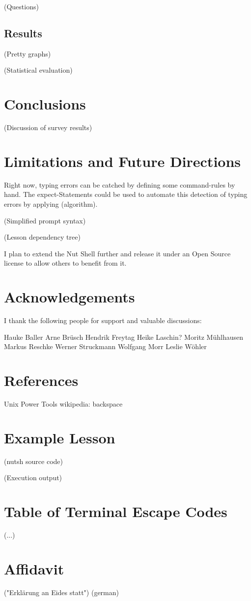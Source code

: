 \documentclass[twoside,blue]{tubsreprt}
\begin{document}
(Questions)

\section{Results}

(Pretty graphs)

(Statistical evaluation)

\chapter{Conclusions}

(Discussion of survey results)

\chapter{Limitations and Future Directions}

Right now, typing errors can be catched by defining some command-rules by hand. The expect-Statements could be used to automate this detection of typing errors by applying (algorithm).

    (Simplified prompt syntax)

    (Lesson dependency tree)

I plan to extend the Nut Shell further and release it under an Open Source license to allow others to benefit from it.

\chapter{Acknowledgements}

I thank the following people for support and valuable discussions:

Hauke Baller
Arne Brüsch
Hendrik Freytag
Heike Laschin?
Moritz Mühlhausen
Markus Reschke
Werner Struckmann
Wolfgang Morr
Leslie Wöhler

\chapter{References}

Unix Power Tools
wikipedia: backspace

\appendix

\chapter{Example Lesson}

(nutsh source code)

(Execution output)

\chapter{Table of Terminal Escape Codes}

(...)

\chapter*{Affidavit}

("Erklärung an Eides statt")
\vspace{8em}
(german)
\end{document}

